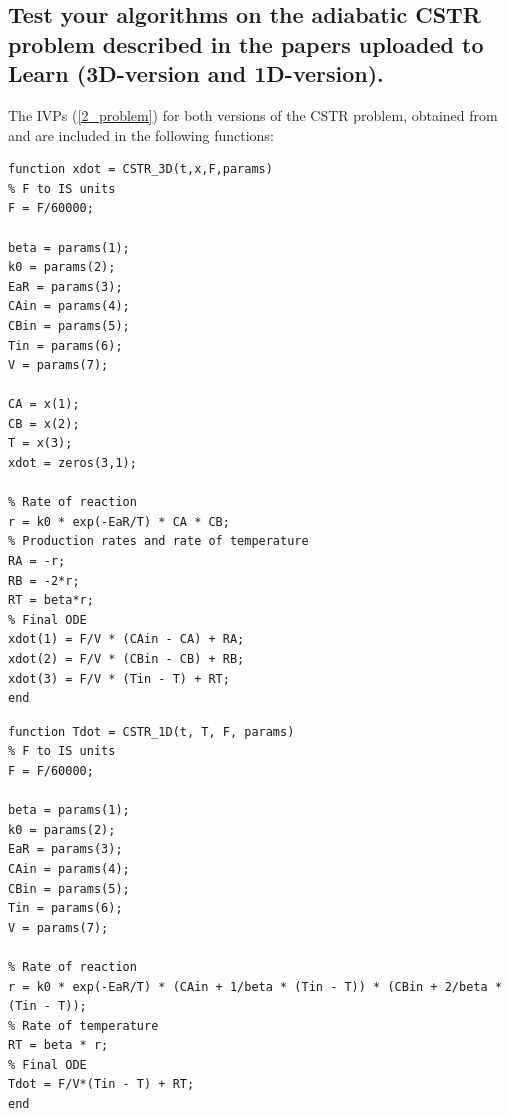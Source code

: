 \pagebreak
\pagebreak
\pagebreak
\pagebreak

\subsection{Test your algorithms on the adiabatic CSTR problem described in the papers uploaded to Learn (3D-version and 1D-version).}
The IVPs (\ref{2_problem}) for both versions of the CSTR problem, obtained from \cite{Bagterp1} and \cite{Bagterp2} are included in the following functions:

\begin{lstlisting}[caption = CSTR 3D equation, captionpos=b, label=CSTR_3D_eq]
function xdot = CSTR_3D(t,x,F,params)
% F to IS units
F = F/60000;

beta = params(1);
k0 = params(2);
EaR = params(3);
CAin = params(4);
CBin = params(5);
Tin = params(6);
V = params(7);

CA = x(1);
CB = x(2);
T = x(3);
xdot = zeros(3,1);

% Rate of reaction
r = k0 * exp(-EaR/T) * CA * CB;
% Production rates and rate of temperature
RA = -r;
RB = -2*r;
RT = beta*r;
% Final ODE
xdot(1) = F/V * (CAin - CA) + RA;
xdot(2) = F/V * (CBin - CB) + RB;
xdot(3) = F/V * (Tin - T) + RT;
end

\end{lstlisting}

\begin{lstlisting}[caption = CSTR 1D equation, captionpos=b, label=CSTR_1D_eq]
function Tdot = CSTR_1D(t, T, F, params)
% F to IS units
F = F/60000;

beta = params(1);
k0 = params(2);
EaR = params(3);
CAin = params(4);
CBin = params(5);
Tin = params(6);
V = params(7);

% Rate of reaction
r = k0 * exp(-EaR/T) * (CAin + 1/beta * (Tin - T)) * (CBin + 2/beta * (Tin - T));
% Rate of temperature
RT = beta * r;
% Final ODE
Tdot = F/V*(Tin - T) + RT;
end

\end{lstlisting}

